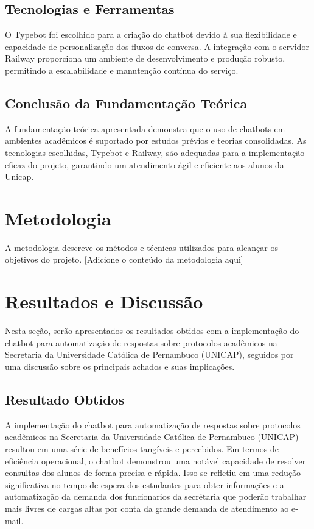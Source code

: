 \documentclass[12pt,a4paper]{article} %
\begin{document}
\subsection{Tecnologias e Ferramentas}

\noindent O Typebot foi escolhido para a criação do chatbot devido à sua flexibilidade e capacidade de personalização dos fluxos de conversa. A integração com o servidor Railway proporciona um ambiente de desenvolvimento e produção robusto, permitindo a escalabilidade e manutenção contínua do serviço.

\subsection{Conclusão da Fundamentação Teórica}

\noindent A fundamentação teórica apresentada demonstra que o uso de chatbots em ambientes acadêmicos é suportado por estudos prévios e teorias consolidadas. As tecnologias escolhidas, Typebot e Railway, são adequadas para a implementação eficaz do projeto, garantindo um atendimento ágil e eficiente aos alunos da Unicap.

\section{Metodologia}

\noindent A metodologia descreve os métodos e técnicas utilizados para alcançar os objetivos do projeto. [Adicione o conteúdo da metodologia aqui]

\section{Resultados e Discussão}

\noindent Nesta seção, serão apresentados os resultados obtidos com a implementação do chatbot para automatização de respostas sobre protocolos acadêmicos na Secretaria da Universidade Católica de Pernambuco (UNICAP), seguidos por uma discussão sobre os principais achados e suas implicações.

\subsection{Resultado Obtidos}

\noindent A implementação do chatbot para automatização de respostas sobre protocolos acadêmicos na Secretaria da Universidade Católica de Pernambuco (UNICAP) resultou em uma série de benefícios tangíveis e percebidos. Em termos de eficiência operacional, o chatbot demonstrou uma notável capacidade de resolver consultas dos alunos de forma precisa e rápida. Isso se refletiu em uma redução significativa no tempo de espera dos estudantes para obter informações e a automatização da demanda dos funcionarios da secrétaria que poderão trabalhar mais livres de cargas altas por conta da grande demanda de atendimento ao e-mail.
\end{document}
